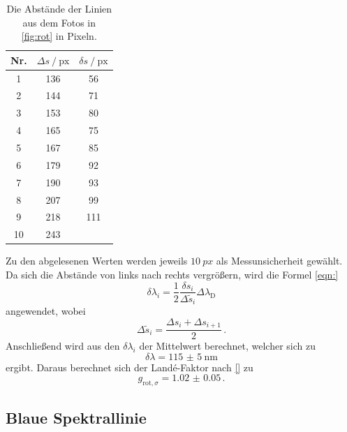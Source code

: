   \begin{table}
    \centering
    \caption{Die Abstände der Linien aus dem Fotos in \autoref{fig:rot} in Pixeln.}
    \label{tab:rotsigmas}
    \begin{tabular}{c S[table-format=3.0] S[table-format=3.0]}
      \toprule
      {Nr.} & {$\Delta s \mathbin{/} \text{px}$} & {$\delta s \mathbin{/} \text{px}$} \\
        &  136   &   56\\
       2  &  144   &   71\\
       3  &  153   &   80\\
       4  &  165   &   75\\
       5  &  167   &   85\\
       6  &  179   &   92\\
       7  &  190   &   93\\
       8  &  207   &   99\\
       9  &  218   &   111\\
      10  &  243     \\
      \bottomrule
    \end{tabular}
  \end{table}

  \noindent Zu den abgelesenen Werten werden jeweils $\SI{10}{px}$ als Messunsicherheit gewählt. Da sich die Abstände von links nach rechts vergrößern,
  wird die Formel \eqref{eqn:}
  \begin{equation*}
    \delta \lambda_i = \frac{1}{2} \frac{\delta s_i}{\Delta \tilde{s}_i} \Delta \lambda_\text{D}
  \end{equation*}
  angewendet, wobei 
  \begin{equation*}
    \Delta \tilde{s}_i = \frac{\Delta s_i + \Delta s_{i+1}}{2}\, .
  \end{equation*} 
  Anschließend wird aus den $\delta \lambda_i$ der Mittelwert berechnet, welcher sich zu 
  \begin{equation*}
    \delta \lambda = \SI{115(5)}{\nano\metre}
  \end{equation*}
  ergibt. 
  Daraus berechnet sich der Land\'{e}-Faktor nach \eqref{} zu 
  \begin{equation*}
    g_{\text{rot}, \sigma} = \num{1.02(5)}\, .
  \end{equation*}

 
\subsection{Blaue Spektrallinie}

